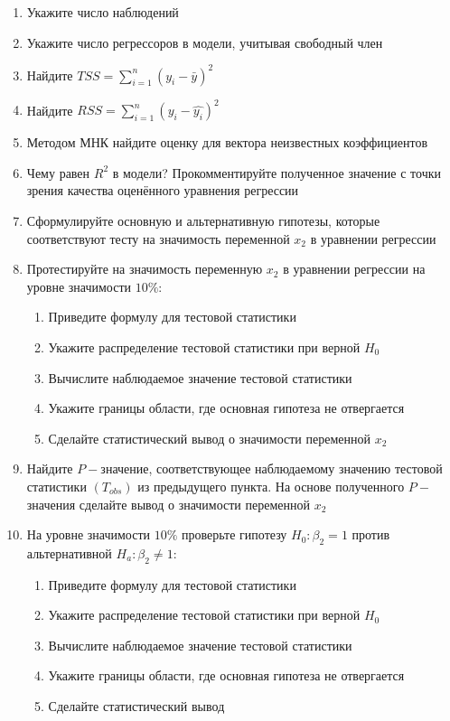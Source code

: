 \documentclass[pdftex,11pt,openany]{book}\usepackage[]{graphicx}\usepackage[]{color}
\begin{document}
\begin{problem}
\begin{enumerate}
\item Укажите число наблюдений
\item Укажите число регрессоров в модели, учитывая свободный член
\item Найдите $TSS = \sum_{i=1}^n (y_i - \bar y)^2$
\item Найдите $RSS = \sum_{i=1}^n (y_i - \hat{y_i})^2$
\item Методом МНК найдите оценку для вектора неизвестных коэффициентов
\item Чему равен $R^2$ в модели? Прокомментируйте полученное значение с точки зрения качества оценённого уравнения регрессии
\item Сформулируйте основную и альтернативную гипотезы, которые соответствуют тесту на значимость переменной $x_2$ в уравнении регрессии
\item Протестируйте на значимость переменную $x_2$ в уравнении регрессии на уровне значимости $10\%$:
\begin{enumerate}
\item Приведите формулу для тестовой статистики 
\item Укажите распределение тестовой статистики при верной $H_0$
\item Вычислите наблюдаемое значение тестовой статистики
\item Укажите границы области, где основная гипотеза не отвергается
\item Сделайте статистический вывод о значимости переменной $x_2$
\end{enumerate}
\item Найдите $P-$значение, соответствующее наблюдаемому значению тестовой статистики $(T_{obs})$ из предыдущего пункта. На основе полученного $P-$значения сделайте вывод о значимости переменной $x_2$
\item На уровне значимости $10\%$ проверьте гипотезу $H_0: \beta_2 = 1$ против альтернативной $H_a: \beta_2 \not= 1$:
\begin{enumerate}
\item Приведите формулу для тестовой статистики 
\item Укажите распределение тестовой статистики при верной $H_0$
\item Вычислите наблюдаемое значение тестовой статистики
\item Укажите границы области, где основная гипотеза не отвергается
\item Сделайте статистический вывод
\end{enumerate}

\end{enumerate}
\end{problem}
\end{document}

